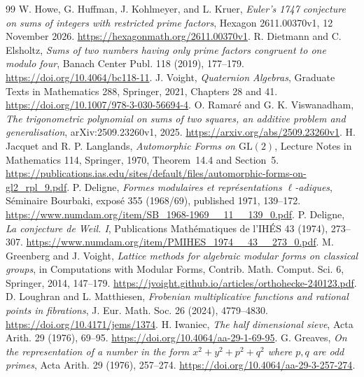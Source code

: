 \begin{thebibliography}{99}\small
{} W. Howe, G. Huffman, J. Kohlmeyer, and L. Kruer,
\emph{Euler's 1747 conjecture on sums of integers with restricted prime
factors}, Hexagon 2611.00370v1, 12 November 2026.
\url{https://hexagonmath.org/2611.00370v1}.
 R. Dietmann and C. Elsholtz,
\emph{Sums of two numbers having only prime factors congruent to one
modulo four}, Banach Center Publ. 118 (2019), 177--179.
\url{https://doi.org/10.4064/bc118-11}.
 J. Voight, \emph{Quaternion Algebras}, Graduate Texts in
Mathematics 288, Springer, 2021, Chapters 28 and 41.
\url{https://doi.org/10.1007/978-3-030-56694-4}.
 O. Ramar\'e and G. K. Viswanadham,
\emph{The trigonometric polynomial on sums of two squares, an additive
problem and generalisation}, arXiv:2509.23260v1, 2025.
\url{https://arxiv.org/abs/2509.23260v1}.
 H. Jacquet and R. P. Langlands,
\emph{Automorphic Forms on $\mathrm{GL}(2)$}, Lecture Notes in Mathematics
114, Springer, 1970, Theorem~14.4 and Section~5.
\url{https://publications.ias.edu/sites/default/files/automorphic-forms-on-gl2_rpl_9.pdf}.
 P. Deligne,
\emph{Formes modulaires et repr\'esentations $\ell$-adiques},
S\'eminaire Bourbaki, expos\'e 355 (1968/69), published 1971, 139--172.
\url{https://www.numdam.org/item/SB_1968-1969__11__139_0.pdf}.
 P. Deligne, \emph{La conjecture de Weil. I},
Publications Math\'ematiques de l'IH\'ES 43 (1974), 273--307.
\url{https://www.numdam.org/item/PMIHES_1974__43__273_0.pdf}.
 M. Greenberg and J. Voight,
\emph{Lattice methods for algebraic modular forms on classical groups},
in Computations with Modular Forms, Contrib. Math. Comput. Sci. 6,
Springer, 2014, 147--179.
\url{https://jvoight.github.io/articles/orthohecke-240123.pdf}.
 D. Loughran and L. Matthiesen,
\emph{Frobenian multiplicative functions and rational points in fibrations},
J. Eur. Math. Soc. 26 (2024), 4779--4830.
\url{https://doi.org/10.4171/jems/1374}.
 H. Iwaniec, \emph{The half dimensional sieve},
Acta Arith. 29 (1976), 69--95.
\url{https://doi.org/10.4064/aa-29-1-69-95}.
 G. Greaves, \emph{On the representation of a number
in the form \(x^2+y^2+p^2+q^2\) where \(p,q\) are odd primes},
Acta Arith. 29 (1976), 257--274.
\url{https://doi.org/10.4064/aa-29-3-257-274}.
\end{thebibliography}
